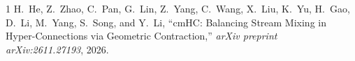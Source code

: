 \documentclass[11pt,a4paper]{article}
\begin{document}
\begin{thebibliography}{1}
H.~He, Z.~Zhao, C.~Pan, G.~Lin, Z.~Yang, C.~Wang, X.~Liu, K.~Yu, H.~Gao, D.~Li, M.~Yang, S.~Song, and Y.~Li,
``cmHC: Balancing Stream Mixing in Hyper-Connections via Geometric Contraction,''
\textit{arXiv preprint arXiv:2611.27193}, 2026.
\end{thebibliography}
\end{document}
